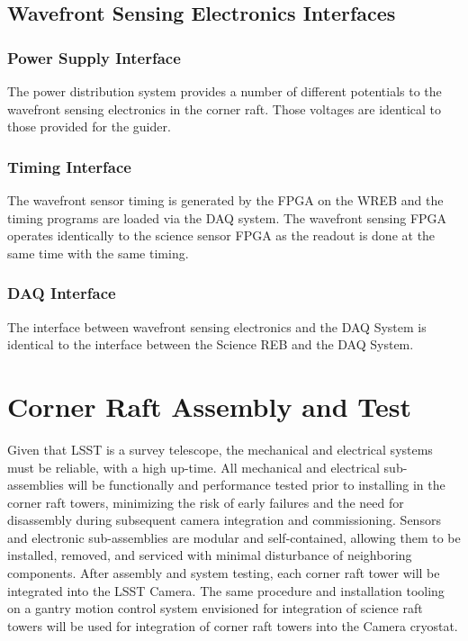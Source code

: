 \subsection{Wavefront Sensing Electronics Interfaces}

\subsubsection{Power Supply Interface}
The power distribution system provides a number of different potentials to the wavefront sensing
electronics in the corner raft. Those voltages are identical to those provided for the guider.

\subsubsection{Timing Interface}
The wavefront sensor timing is generated by the FPGA on the WREB and the timing programs are loaded
via the DAQ system. The wavefront sensing FPGA operates identically to the science sensor FPGA as the
readout is done at the same time with the same timing.

\subsubsection{DAQ Interface}
The interface between wavefront sensing electronics and the DAQ System is identical to the interface
between the Science REB and the DAQ System.

\section{Corner Raft Assembly and Test}

Given that LSST is a survey telescope, the mechanical and electrical systems must be reliable, with a high
up-time. All mechanical and electrical sub-assemblies will be functionally and performance tested prior
to installing in the corner raft towers, minimizing the risk of early failures and the need for disassembly
during subsequent camera integration and commissioning. Sensors and electronic sub-assemblies are
modular and self-contained, allowing them to be installed, removed, and serviced with minimal
disturbance of neighboring components.
After assembly and system testing, each corner raft tower will be integrated into the LSST Camera. The
same procedure and installation tooling on a gantry motion control system envisioned for integration of
science raft towers will be used for integration of corner raft towers into the Camera cryostat.

